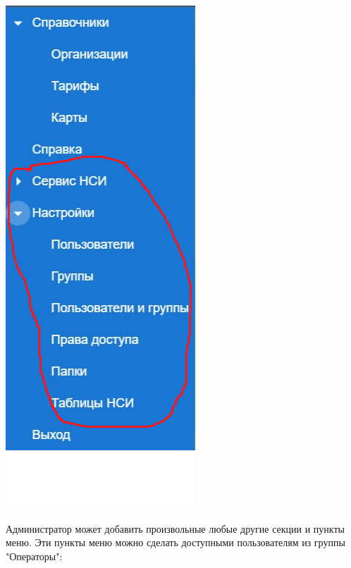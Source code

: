 \documentclass[12pt, a4paper]{article}
\begin{document}
\begin{center}
    \includegraphics {p2.png}
\end{center}

Администратор может добавить произвольные любые другие секции и пункты меню. 
Эти пункты меню можно сделать доступными пользователям из группы "Операторы":
\end{document}
